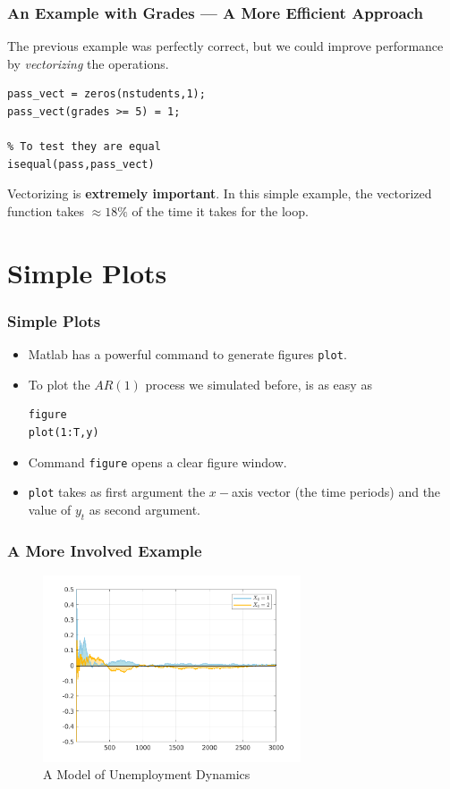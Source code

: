 \documentclass[11pt,xcolor={svgnames},aspectratio=169,usepdftitle=false]{beamer}
\begin{document}
\begin{frame}[fragile]
    \frametitle{An Example with Grades --- A More Efficient Approach}
The previous example was perfectly correct, but we could improve performance by \alert{\textit{vectorizing}} the operations.

\begin{lstlisting}
pass_vect = zeros(nstudents,1);
pass_vect(grades >= 5) = 1;

% To test they are equal
isequal(pass,pass_vect)
\end{lstlisting}    

Vectorizing is \alert{\textbf{extremely important}}. In this simple example, the vectorized function takes $\approx 18\%$ of the time it takes for the loop.

\end{frame}

\section{Simple Plots}

\begin{frame}[fragile]
    \frametitle{Simple Plots}
    \begin{itemize}
        \item Matlab has a powerful command to generate figures \verb;plot;.
        \item To plot the $AR(1)$ process we simulated before, is as easy as
\begin{lstlisting}
figure
plot(1:T,y)
\end{lstlisting}
        \item Command \verb;figure; opens a clear figure window.
        \item \verb;plot; takes as first argument the $x-$axis vector (the time periods) and the value of $y_t$ as second argument.
    \end{itemize}
\end{frame}

\begin{frame}
    \frametitle{A More Involved Example}
\begin{figure}
    \centering
    \includegraphics[width = 0.68\textwidth]{../figures/unemployment_dynamics.png}
    \caption{A Model of Unemployment Dynamics}
    \label{fig:unemployment}
\end{figure}
\end{frame}
\end{document}
